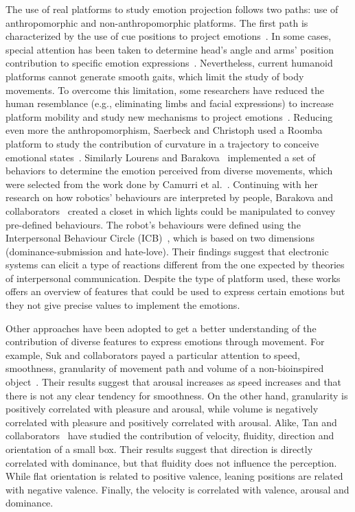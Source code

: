 The use of real platforms to study emotion projection follows two paths: use of anthropomorphic and non-anthropomorphic platforms. The first path is characterized by the use of cue positions to project emotions~\cite{NAO2013}. In some cases, special attention has been taken to determine head's angle and arms' position contribution to specific emotion expressions~\cite{Brown2014}. 
Nevertheless, current humanoid platforms cannot generate smooth gaits, which limit the study of body movements. To overcome this limitation, some researchers have reduced the human resemblance (e.g., eliminating limbs and facial expressions) to increase platform mobility and study new mechanisms to project emotions~\cite{Arras2012}. Reducing even more the anthropomorphism, Saerbeck and Christoph used a Roomba platform to study the contribution of curvature in a trajectory to conceive emotional states~\cite{Saerbeck2010}. Similarly Lourens and Barakova~\cite{BarakovaL10} implemented a set of behaviors to determine the emotion  perceived from diverse movements, which were selected from the work done by Camurri et al.~\cite{pop00002}. Continuing with her research on how robotics' behaviours are interpreted by people, Barakova and collaborators~\cite{Barakova2013} created a closet in which lights could be manipulated to convey pre-defined behaviours. The robot's behaviours were defined using the Interpersonal Behaviour Circle (ICB)~\cite{Leary57}, which is based on two dimensions (dominance-submission and hate-love). Their findings suggest that electronic systems can elicit a type of reactions different from the one expected by theories of interpersonal communication. Despite the type of platform used, these works offers an overview of features that could be used to express certain emotions but they not give precise values to implement the emotions.

Other approaches have been adopted to get a better understanding of the contribution of diverse features to express emotions through movement. For example, Suk and collaborators payed a particular attention to speed, smoothness, granularity of movement path and volume of a non-bioinspired object~\cite{NAM2014}. Their results suggest that arousal increases as speed increases and that there is not any clear tendency for smoothness. On the other hand, granularity is positively correlated with pleasure and arousal, while volume is negatively correlated with pleasure and positively correlated with arousal. Alike, Tan and collaborators~\cite{Tan2016} have studied the contribution of velocity, fluidity, direction and orientation of a small box. Their results suggest that direction is directly correlated with dominance, but that fluidity does not influence the perception. While flat orientation is related to positive valence, leaning positions are related with negative valence. Finally, the velocity is correlated with valence, arousal and dominance.  

